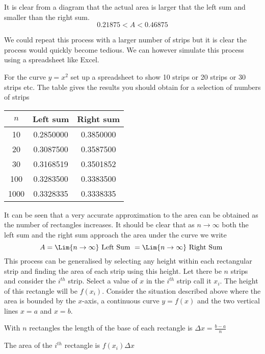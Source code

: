 It is clear from a diagram that the actual area is larger that the left sum and smaller than the
right sum.
\begin{equation*}0.21875 <A <0.46875
\end{equation*}

We could repeat this process with a larger number of strips but it is clear the process
would quickly become tedious. We can however simulate this process using a spreadsheet like Excel. 

For the curve $y =x^{2}$ set up a spreadsheet to show 10 strips or 20 strips or
30 strips etc. The table gives the results you should obtain for a selection of numbers of strips

\begin{center}
	\begin{tabular}[c]{ccc}\hline
		$n$  & Left sum  & Right sum  \\
		\hline
		10
		& 0.2850000  & 0.3850000  \\
		\hline
		20
		& 0.3087500  & 0.3587500  \\
		\hline
		30
		& 0.3168519  & 0.3501852  \\
		\hline
		100
		& 0.3283500  & 0.3383500  \\
		\hline
		1000
		& 0.3328335  & 0.3338335  \\
		\hline
\end{tabular}\end{center}
It can be seen that a very accurate approximation to the area can be obtained as the number of rectangles increases. It should be clear that as $n \rightarrow \infty $ both the left sum and the right sum approach the area under the curve we write
\begin{equation*}A =\Lim{n \to \infty}\text{ Left Sum } =\Lim{n \to \infty}\text{ Right Sum }
\end{equation*}
This process can be generalised by selecting any height within each rectangular strip
and finding the area of each strip using this height. Let there be $n$ strips and consider the $i^{t h}$ strip. Select a value of $x$ in the $i^{t h}$ strip call it $x_{i}$. The height of this rectangle will be $f (x_{i})$. Consider the situation described above where the area is bounded by the $x$-axis, a continuous curve $y =f (x)$ and the two vertical lines $x =a$ and $x =b$. 

With $n$ rectangles the length of the base of each rectangle is $ \Delta x =\frac{b -a}{n}$ 

The area of the $i^{t h}$ rectangle is $f (x_{i})  \Delta x$ 


